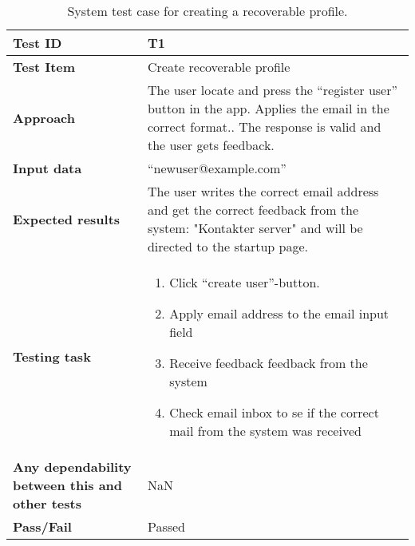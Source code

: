 \begin{center}
	\begin{table}[H]
		\begin{tabular}{ | p{4cm} | p{12cm}  |}
			\hline
			\textbf{Test ID} & T1  \\ \hline
			\textbf{Test Item} & Create recoverable profile \\ \hline
			\textbf{Approach} & The user locate and press the “register user” button in the app. Applies the email in the correct format.. The response is valid and the user gets feedback. \\ \hline
			\textbf{Input data} &  “newuser@example.com”\\ \hline
			
			\textbf{Expected results} & The user writes the correct email address and get the correct feedback from the system: "Kontakter server" and will be directed to the startup page.\\ \hline
		
			\textbf{Testing task} & 
			\begin{enumerate}[noitemsep]
			\item Click  “create user”-button.
			\item Apply email address to the email input field 
			\item Receive feedback feedback from the system
			\item Check email inbox to se if the correct mail from the system was received 
			 \end{enumerate}
			\\ \hline
			\textbf{Any dependability between this and other tests} & NaN \\ \hline	
			\textbf{Pass/Fail} & Passed \\\hline				
		\end{tabular}

	\caption{System test case for creating a recoverable profile.}
	\label{Tab_systemTesting1}
	\end{table}
\end{center}

